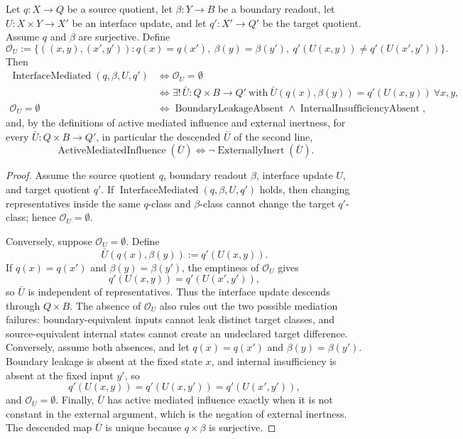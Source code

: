\begin{theorem}\label{thm:F22}
Let \(q:X\to Q\) be a source quotient, let
\(\beta:Y\to B\) be a boundary readout, let
\(U:X\times Y\to X'\) be an interface update, and let
\(q':X'\to Q'\) be the target quotient.  Assume \(q\) and \(\beta\) are surjective.  Define
\[
  \mathcal O_U
  :=
  \{((x,y),(x',y')) :
    q(x)=q(x'),\ \beta(y)=\beta(y'),\
    q'(U(x,y))\ne q'(U(x',y'))\}.
\]
Then
\begin{align*}
  \operatorname{InterfaceMediated}(q,\beta,U,q')
  &\iff \mathcal O_U=\emptyset\\
  &\iff
  \exists!\,\bar U:Q\times B\to Q'\ \text{with}\
    \bar U(q(x),\beta(y))=q'(U(x,y))\ \forall x,y,\\
  \mathcal O_U=\emptyset
  &\iff
  \operatorname{BoundaryLeakageAbsent}\wedge
  \operatorname{InternalInsufficiencyAbsent},
\end{align*}
and, by the definitions of active mediated influence and external inertness,
for every \(\bar U:Q\times B\to Q'\), in particular the descended \(\bar U\) of the
second line,
\[
  \operatorname{ActiveMediatedInfluence}(\bar U)
  \iff \neg\operatorname{ExternallyInert}(\bar U).
\]
\end{theorem}
\begin{proof}
Assume the source quotient \(q\), boundary readout \(\beta\),
interface update \(U\), and target quotient \(q'\).  If
\(\operatorname{InterfaceMediated}(q,\beta,U,q')\) holds, then
changing representatives inside the same \(q\)-class and
\(\beta\)-class cannot change the target \(q'\)-class; hence
\(\mathcal O_U=\emptyset\).

Conversely, suppose \(\mathcal O_U=\emptyset\).  Define
\[
  \bar U(q(x),\beta(y)):=q'(U(x,y)).
\]
If \(q(x)=q(x')\) and \(\beta(y)=\beta(y')\), the emptiness of
\(\mathcal O_U\) gives
\[
  q'(U(x,y))=q'(U(x',y')),
\]
so \(\bar U\) is independent of representatives.  Thus the
interface update descends through \(Q\times B\).  The absence of
\(\mathcal O_U\) also rules out the two possible mediation failures:
boundary-equivalent inputs cannot leak distinct target classes, and
source-equivalent internal states cannot create an undeclared target
difference.  Conversely, assume both absences, and let \(q(x)=q(x')\) and
\(\beta(y)=\beta(y')\).  Boundary leakage is absent at the fixed state
\(x\), and internal insufficiency is absent at the fixed input \(y'\), so
\[
  q'(U(x,y))=q'(U(x,y'))=q'(U(x',y')),
\]
and \(\mathcal O_U=\emptyset\).  Finally, \(\bar U\) has active mediated influence
exactly when it is not constant in the external argument, which is
the negation of external inertness.
The descended map \(\bar U\) is unique because \(q\times\beta\) is surjective.
\end{proof}

